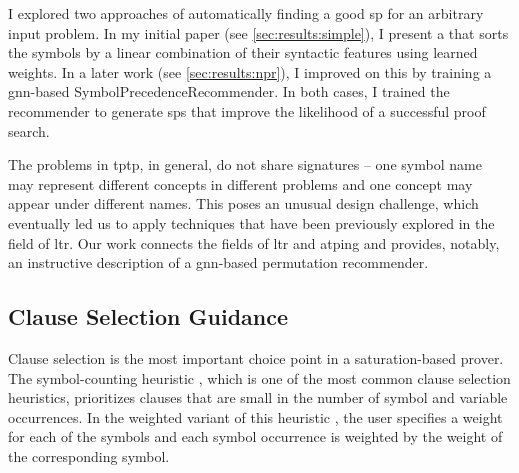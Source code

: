 I explored two approaches of automatically finding a good \gls{sp} for an arbitrary input problem.
In my initial paper \cite{DBLP:conf/cade/Bartek020} (see \cref{sec:results:simple}),
I present a  that sorts the symbols by a linear combination of their syntactic features using learned weights.
In a later work \cite{DBLP:conf/cade/Bartek021} (see \cref{sec:results:npr}),
I improved on this by training a \acrshort{gnn}-based \gls{SymbolPrecedenceRecommender}.
In both cases, I trained the recommender to generate \glspl{sp} that improve the likelihood of a successful proof search.


The problems in \gls{tptp}, in general, do not share \glspl{signature} -- one symbol name may represent different concepts in different problems and one concept may appear under different names.
This poses an unusual design challenge,
which eventually led us to apply techniques that have been previously explored in the field of \gls{ltr}.
Our work connects the fields of \gls{ltr} and \gls{atping} and provides, notably, an instructive description of a \acrshort{gnn}-based permutation recommender.

\subsection{Clause Selection Guidance}
\label{sec:contrib:ClauseSelection}


Clause selection is the most important choice point in a saturation-based prover.
The symbol-counting heuristic \cite{DBLP:conf/cade/SchulzM16}, which is one of the most common clause selection heuristics,
prioritizes clauses that are small in the number of symbol and variable occurrences.
In the weighted variant of this heuristic \cite{E-manual},
the user specifies a weight for each of the symbols
and each symbol occurrence is weighted by the weight of the corresponding symbol.

